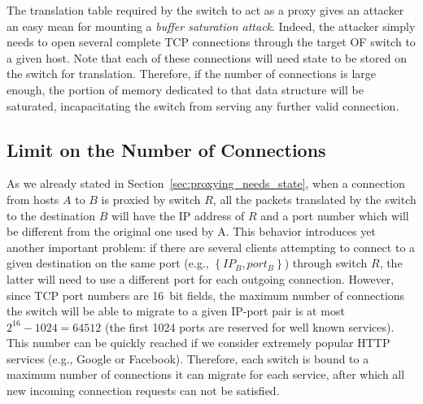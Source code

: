 \documentclass{sig-alternate}
\begin{document}
The translation table required by the switch to act as a proxy gives an attacker an easy mean for mounting a {\em buffer saturation attack}.
Indeed, the attacker simply needs to open several complete TCP connections through the target OF switch to a given host.
Note that each of these connections will need state to be stored on the switch for translation. 
Therefore, if the number of connections is large enough, the portion of memory dedicated to that data structure will be saturated, 
incapacitating the switch from serving any further valid connection.


\subsection{Limit on the Number of Connections}
\label{sec:proxy_ports}
As we already stated in Section~\ref{sec:proxying_needs_state}, when a connection from hosts $A$ to $B$ is proxied by switch $R$, 
all the packets translated by the switch to the destination $B$ will have the IP address of $R$ and a port number which will be different 
from the original one used by A.
This behavior introduces yet another important problem: if there are several clients attempting to connect to a given destination on the same port 
(e.g., $\left\{ {IP_{B}, port_{B}} \right\}$) through switch $R$, the latter will need to use a different port for each outgoing connection.
However, since TCP port numbers are 16~bit fields, the maximum number of connections the switch will be able to migrate to a given IP-port pair 
is at most $2^{16} - 1024 = 64512$ (the first 1024 ports are reserved for well known services).
This number can be quickly reached if we consider extremely popular HTTP services (e.g., Google or Facebook). 
Therefore, each switch is bound to a maximum number of connections it can migrate for each service, 
after which all new incoming connection requests can not be satisfied.
\end{document}
